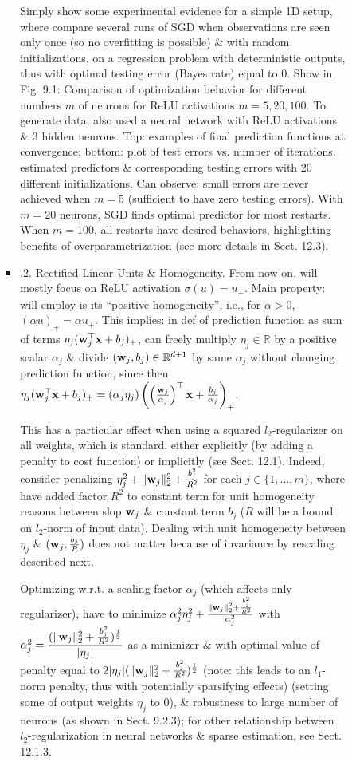 \documentclass{article}
\begin{document}
\begin{enumerate}
\begin{itemize}
\begin{itemize}
\begin{itemize}
				Simply show some experimental evidence for a simple 1D setup, where compare several runs of  SGD when observations are seen only once (so no overfitting is possible) \& with random initializations, on a regression problem with deterministic outputs, thus with optimal testing error (Bayes rate) equal to 0. Show in {\sf Fig. 9.1: Comparison of optimization behavior for different numbers $m$ of neurons for ReLU activations $m = 5,20,100$. To generate data, also used a neural network with ReLU activations \& 3 hidden neurons. Top: examples of final prediction functions at convergence; bottom: plot of test errors vs. number of iterations.} estimated predictors \& corresponding testing errors with 20 different initializations. Can observe: small errors are never achieved when $m = 5$ (sufficient to have zero testing errors). With $m = 20$ neurons, SGD finds optimal predictor for most restarts. When $m = 100$, all restarts have desired behaviors, highlighting benefits of overparametrization (see more details in Sect. 12.3).
				\item {.2. Rectified Linear Units \& Homogeneity.} From now on, will mostly focus on ReLU activation $\sigma(u) = u_+$. Main property: will employ is its ``positive homogeneity'', i.e., for $\alpha > 0$, $(\alpha u)_+ = \alpha u_+$. This implies: in def of prediction function as sum of terms $\eta_j({\bf w}_j^\top{\bf x} + b_j)_+$, can freely multiply $\eta_j\in\mathbb{R}$ by a positive scalar $\alpha_j$ \& divide $({\bf w}_j,b_j)\in\mathbb{R}^{d+1}$ by same $\alpha_j$ without changing prediction function, since then $\eta_j({\bf w}_j^\top{\bf x} + b_j)_+ = (\alpha_j\eta_j)\left(\left(\frac{{\bf w}_j}{\alpha_j}\right)^\top{\bf x} + \frac{b_j}{\alpha_j}\right)_+$.
				
				This has a particular effect when using a squared $l_2$-regularizer on all weights, which is standard, either explicitly (by adding a penalty to cost function) or implicitly (see Sect. 12.1). Indeed, consider penalizing $\eta_j^2 + \|{\bf w}_j\|_2^2 + \frac{b_j^2}{R^2}$ for each $j\in\{1,\ldots,m\}$, where have added factor $R^2$ to constant term for unit homogeneity reasons between slop ${\bf w}_j$ \& constant term $b_j$ ($R$ will be a bound on $l_2$-norm of input data). Dealing with unit homogeneity between $\eta_j$ \& $({\bf w}_j,\frac{b_j}{R})$ does not matter because of invariance by rescaling described next.
				
				Optimizing w.r.t. a scaling factor $\alpha_j$ (which affects only regularizer), have to minimize $\alpha_j^2\eta_j^2 + \frac{\|{\bf w}_j\|_2^2 + \frac{b_j^2}{R^2}}{\alpha_j^2}$ with $\alpha_j^2 = \dfrac{(\|{\bf w}_j\|_2^2 + \frac{b_j^2}{R^2})^{\frac{1}{2}}}{|\eta_j|}$ as a minimizer \& with optimal value of penalty equal to $2|\eta_j|(\|{\bf w}_j\|_2^2 + \frac{b_j^2}{R^2})^{\frac{1}{2}}$ (note: this leads to an $l_1$-norm penalty, thus with potentially sparsifying effects) (setting some of output weights $\eta_j$ to 0), \& robustness to large number of neurons (as shown in Sect. 9.2.3); for other relationship between $l_2$-regularization in neural networks \& sparse estimation, see Sect. 12.1.3.
				

\end{itemize}
\end{itemize}
\end{itemize}
\end{enumerate}
\end{document}
